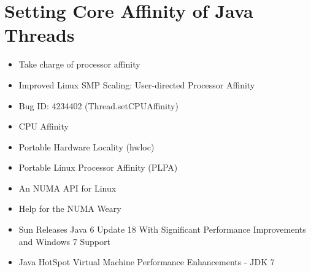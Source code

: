 
\chapter{Setting Core Affinity of Java Threads}
\label{chap:appendix-core-affinity}



\begin{itemize}
\item Take charge of processor affinity \cite{Dow2005}
\item Improved Linux SMP Scaling: User-directed Processor Affinity
  \cite{Foong2008}
\item Bug ID: 4234402 (Thread.setCPUAffinity) \cite{Oracle1999}
\item CPU Affinity \cite{Love2003}
\item Portable Hardware Locality (hwloc) \cite{OpenMPI2010}
\item Portable Linux Processor Affinity (PLPA) \cite{OpenMPI2010}
\item An NUMA API for Linux \cite{Kleen2004}
\item Help for the NUMA Weary \cite{Masamitsu2008}
\item[\checkmark] Sun Releases Java 6 Update 18 With Significant
  Performance Improvements and Windows 7 Support \cite{Humble2010}
\item[\checkmark] Java HotSpot Virtual Machine Performance
  Enhancements - JDK 7 \cite{Oracle2010}
\end{itemize}

